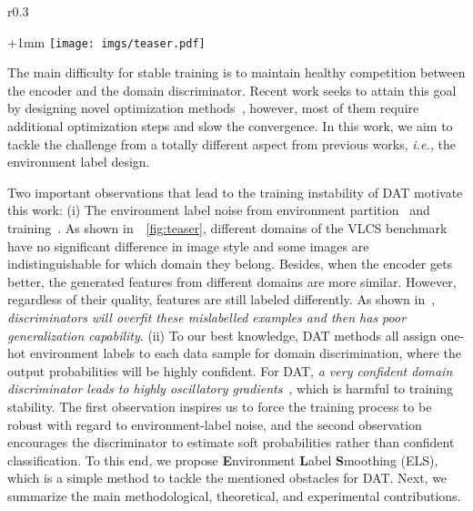\documentclass{article} \usepackage{iclr2023_conference,times}
\newcommand{\ls}[0]{ELS\xspace}
\newcommand{\ie}[0]{\textit{i.e., }}
\begin{document}
\setlength{\columnsep}{8pt}
\begin{wrapfigure}{r}{0.3\textwidth}
  \begin{center}
  \advance\leftskip+1mm
  \renewcommand{\captionlabelfont}{\footnotesize}
    \vspace{-0.39in}  
    \texttt{[image: imgs/teaser.pdf]}
    \vspace{-0.06in} 
    \caption{\textbf{A motivating example} of \ls with 3 domains on the VLCS dataset.}
        \label{fig:teaser}
  \end{center}
  \vspace{-0.16in} 
\end{wrapfigure}

The main difficulty for stable training is 
to maintain healthy competition between the encoder and the domain discriminator. Recent work seeks to attain this goal by designing novel optimization methods~\citep{acuna2022domain,rangwani2022closer}, however, most of them require additional optimization steps and slow the convergence. In this work, we aim to tackle the challenge from a totally different aspect from previous works, \ie the environment label design. 




Two important observations that lead to the training instability of DAT motivate this work: 
(i) The environment label noise from environment partition~\citep{creager2021environment} and training~\citep{thanh2019improving}. As shown in~\figurename~\ref{fig:teaser}, different domains of the VLCS benchmark have no significant difference in image style and some images are indistinguishable for which domain they belong. Besides, when the encoder gets better, the generated features from different domains are more similar. However, regardless of their quality, features are still labeled differently. As shown in~\citep{thanh2019improving,brock2018large}, \textit{discriminators will overfit these mislabelled examples and then has poor generalization capability}. (ii) To our best knowledge, DAT methods all assign one-hot environment labels to each data sample for domain discrimination, where the output probabilities will be highly confident. For DAT, \textit{a very confident domain discriminator leads to highly oscillatory gradients}~\citep{arjovsky2017towards,mescheder2018training}, which is harmful to training stability. The first observation inspires us to force the training process to be robust with regard to environment-label noise, and the second observation encourages the discriminator to estimate soft probabilities rather than confident classification. To this end, we propose \textbf{E}nvironment \textbf{L}abel \textbf{S}moothing (\ls), which is a simple method to tackle the mentioned obstacles for DAT. Next, we summarize the main methodological, theoretical, and experimental contributions.
\end{document}
